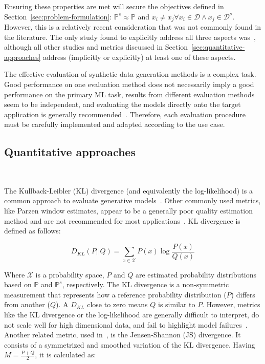 Ensuring these properties are met will secure the objectives defined in
Section~\ref{sec:problem-formulation}: $\mathbb{P}^s \approx
\mathbb{P}$ and $x_i \neq x_j \forall x_i \in \mathcal{D} \wedge x_j \in
\mathcal{D}^s$. However, this is a relatively recent consideration that was
not commonly found in the literature. The only study found to explicitly
address all three aspects was~\cite{alaa2022faithful}, although all other
studies and metrics discussed in Section~\ref{sec:quantitative-approaches}
address (implicitly or explicitly) at least one of these aspects.

The effective evaluation of synthetic data generation methods is a complex
task. Good performance on one evaluation method does not
necessarily imply a good performance on the primary ML task, results from
different evaluation methods seem to be independent, and evaluating the models
directly onto the target application is generally
recommended~\cite{theis2016note}. Therefore, each evaluation procedure must be
carefully implemented and adapted according to the use case.

\subsection{Quantitative approaches}~\label{sec:quantitative-approaches}

The Kullback-Leibler (KL) divergence (and equivalently the log-likelihood) is a
common approach to evaluate generative models~\cite{theis2016note}. Other
commonly used metrics, like Parzen window estimates, appear to be a generally
poor quality estimation method and are not recommended for most
applications~\cite{theis2016note}. KL divergence is defined as follows:

\begin{equation}
    D_{KL}(P||Q) = \sum_{x\in\mathcal{X}}P(x)\log{\frac{P(x)}{Q(x)}}
\end{equation}

Where $\mathcal{X}$ is a probability space, $P$ and $Q$ are estimated
probability distributions based on $\mathbb{P}$ and $\mathbb{P}^s$,
respectively. The KL divergence is a non-symmetric measurement that represents
how a reference probability distribution ($P$) differs from another
($Q$). A $D_{KL}$ close to zero means $Q$ is similar to $P$. However, metrics
like the KL divergence or the log-likelihood are generally difficult to
interpret, do not scale well for high dimensional data, and fail to
highlight model failures~\cite{alaa2022faithful}. Another related metric, used
in~\cite{zhao2021ctab}, is the Jensen-Shannon (JS) divergence. It consists of
a symmetrized and smoothed variation of the KL divergence. Having
$M=\frac{P+Q}{2}$, it is calculated as:

